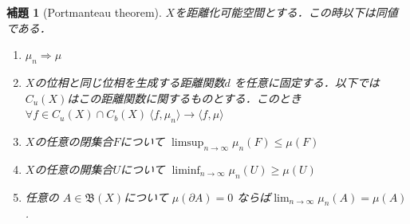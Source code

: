 \documentclass[leqno, a4paper, 12pt]{jsarticle}
\newtheorem{lem}[thm]{補題}
\newcommand{\To}{\Longrightarrow}
\begin{document}
\begin{lem}[Portmanteau theorem]\label{lem:port}
$X$を距離化可能空間とする．この時以下は同値である．
\begin{enumerate}
	\item $\mu_n\To \mu$
	\item $X$の位相と同じ位相を生成する距離関数$d$
	を任意に固定する．以下では$C_{u}(X)$はこの距離関数に関するものとする．このとき
		$\forall f\in C_u(X)\cap C_b(X)\ 
		\langle f, \mu_n\rangle\to \langle f, \mu \rangle $
	\item 
		$X$の任意の閉集合$F$について
		$\limsup_{n\to \infty}\mu_n(F)\le \mu(F)$
	\item $X$の任意の開集合$U$について
		$\liminf_{n\to \infty}\mu_n(U)\ge \mu(U)$
			\item[\emph{(6)}] 任意の
			$A\in \mathfrak{B}(X)$について 
			$\mu(\partial A)=0$
		ならば$\lim_{n\to \infty}\mu_n(A)=\mu(A)$. 

\end{enumerate}
\end{lem}
\end{document}
